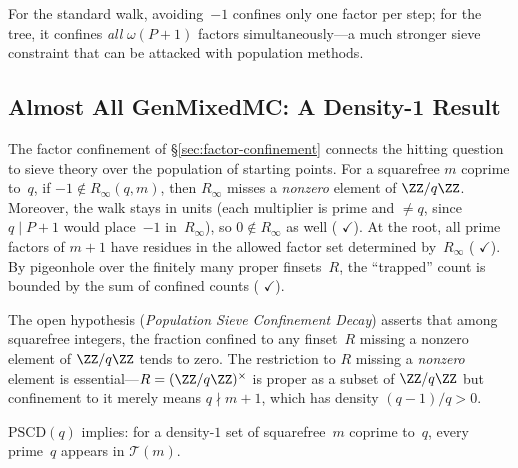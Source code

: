 \smallskip\noindent
For the standard walk, avoiding~$-1$ confines only one factor per
step; for the tree, it confines \emph{all} $\omega(P{+}1)$ factors
simultaneously---a much stronger sieve constraint that can be
attacked with population methods.

\subsection{Almost All GenMixedMC: A Density-1 Result}
\label{sec:almost-all-mixed}

The factor confinement of \S\ref{sec:factor-confinement} connects
the hitting question to sieve theory over the population of starting
points.  For a squarefree $m$ coprime to~$q$, if
$-1 \notin R_\infty(q,m)$, then $R_\infty$ misses a
\emph{nonzero} element of $\ZZ/q\ZZ$.  Moreover, the walk stays in
units (each multiplier is prime and $\neq q$, since $q \mid P{+}1$
would place~$-1$ in~$R_\infty$), so
$0 \notin R_\infty$ as well
(
{\color{leanink}$\checkmark$}).
At the root, all prime factors of $m{+}1$ have residues in the
allowed factor set determined by~$R_\infty$
(
{\color{leanink}$\checkmark$}).
By pigeonhole over the finitely many proper finsets~$R$, the
``trapped'' count is bounded by the sum of confined counts
(
{\color{leanink}$\checkmark$}).

The open hypothesis 
(\emph{Population Sieve Confinement Decay}) asserts that among
squarefree integers, the fraction confined to any finset~$R$ missing
a nonzero element of $\ZZ/q\ZZ$ tends to zero.
The restriction to $R$ missing a
\emph{nonzero} element is essential---$R =
(\ZZ/q\ZZ)^\times$ is proper as a subset of $\ZZ/q\ZZ$
but confinement to it merely means $q \nmid m{+}1$,
which has density $(q{-}1)/q > 0$.

\begin{theorem}
\label{thm:almost-all-mixed}
$\mathrm{PSCD}(q)$ implies: for a density-$1$ set of squarefree~$m$
coprime to~$q$, every prime~$q$ appears in $\mathcal{T}(m)$.
\end{theorem}

